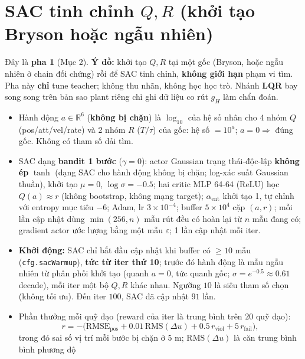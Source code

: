 \documentclass[11pt]{article}
\begin{document}

\section{SAC tinh chỉnh $Q,R$ (khởi tạo Bryson hoặc ngẫu nhiên)}
Đây là \textbf{pha 1} (Mục 2). \textbf{Ý đồ:} khởi tạo $Q,R$ tại một gốc (Bryson, hoặc ngẫu nhiên ở chain đối
chứng) rồi để SAC tinh chỉnh, \textbf{không giới hạn} phạm vi tìm. Pha này \textbf{chỉ} tune teacher; không thu nhãn, không học học trò. Nhánh
\textbf{LQR} bay song song trên bản sao plant riêng chỉ ghi dữ liệu co rút $g_H$ làm chẩn đoán.
\begin{itemize}[leftmargin=1.4em,itemsep=1pt]
\item Hành động $a\in\mathbb R^6$ (\textbf{không bị chặn}) là $\log_{10}$ của hệ số nhân cho 4 nhóm $Q$
(pos/att/vel/rate) và 2 nhóm $R$ ($T/\tau$) của gốc: hệ số $=10^{a}$; $a=0\Rightarrow$ đúng gốc. Không có tham
số dải tìm.
\item SAC dạng \textbf{bandit 1 bước} ($\gamma=0$): actor Gaussian trạng thái-độc-lập \textbf{không ép} $\tanh$
(dạng SAC cho hành động không bị chặn; log-xác suất Gaussian thuần),
khởi tạo $\mu=0$, $\log\sigma=-0.5$; hai critic MLP 64-64 (ReLU) học $Q(a)\approx r$ (không bootstrap,
không mạng target); $\alpha_{\mathrm{ent}}$ khởi tạo 1, tự chỉnh với entropy mục tiêu $-6$; Adam, lr
$3{\times}10^{-4}$; buffer $5{\times}10^4$ cặp $(a,r)$; mỗi lần cập nhật dùng $\min(256,n)$ mẫu rút đều có hoàn lại từ
$n$ mẫu đang có; gradient actor ước lượng bằng một mẫu $\varepsilon$; 1 lần cập nhật mỗi iter.
\item \textbf{Khởi động:} SAC chỉ bắt đầu cập nhật khi buffer có $\ge10$ mẫu (\texttt{cfg.sacWarmup}), \textbf{tức từ
iter thứ 10}; trước đó hành động là mẫu ngẫu nhiên từ phân phối khởi tạo (quanh $a=0$, tức quanh gốc;
$\sigma=e^{-0.5}\approx0.61$ decade), mỗi iter một bộ $Q,R$ khác nhau. Ngưỡng $10$ là siêu tham số chọn (không tối
ưu). Đến iter $100$, SAC đã cập nhật $91$ lần.
\item Phần thưởng mỗi quỹ đạo (reward của iter là trung bình trên $20$ quỹ đạo):
\[
r=-\big(\mathrm{RMSE}_{\mathrm{pos}} + 0.01\,\mathrm{RMS}(\Delta u) + 0.5\,r_{\mathrm{viol}}
+ 5\,r_{\mathrm{fail}}\big),
\]
trong đó sai số vị trí mỗi bước bị chặn ở $5$ m; $\mathrm{RMS}(\Delta u)$ là căn trung bình bình phương độ

\end{itemize}
\end{document}
